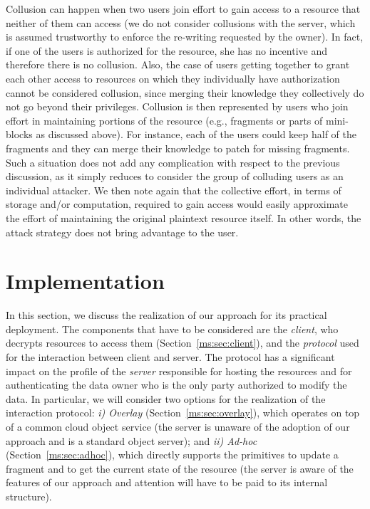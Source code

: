 \medskip
{}
Collusion can happen when two users join effort to gain access to a resource that neither of them can access (we do not consider collusions with the server, which is assumed trustworthy to enforce the re-writing requested by the owner). In fact, if one of the users is authorized for the resource, she has no incentive and therefore there is no collusion. Also, the case of users getting together to grant each other access to resources on which they individually have authorization cannot be considered collusion, since merging their knowledge they collectively do not go beyond their privileges. Collusion is then represented by users who join effort in maintaining portions of the resource (e.g., fragments or parts of mini-blocks as discussed above). For instance, each of the users could keep half of the fragments and they can merge their knowledge to patch for missing fragments. Such a situation does not add any complication with respect to the previous discussion, as it simply reduces to consider the group of colluding users as an individual attacker. We then note again that the collective effort, in terms of storage and/or computation, required to gain access would easily approximate the effort of maintaining the original plaintext resource itself. In other words, the attack strategy does not bring advantage to the user.


\section{Implementation}\label{ms:sec:expe}
In this section, we discuss the realization of our approach for its practical deployment. The components that have to be considered are the {\em client\/}, who decrypts resources to access them (Section~\ref{ms:sec:client}), and the {\em protocol\/} used for the interaction between client and server. The protocol has a significant impact on the profile of the {\em server\/} responsible for hosting the resources and for authenticating the data owner who is the only party authorized to modify the data. In particular, we will consider two options for the realization of the interaction protocol: {\em i) Overlay\/} (Section~\ref{ms:sec:overlay}), which operates on top of a common cloud object service (the server is unaware of the adoption of our approach and is a standard object server); and {\em ii) Ad-hoc} (Section~\ref{ms:sec:adhoc}), which directly supports the primitives to update a fragment and to get the current state of the resource (the server is aware of the features of our approach and attention will have to be paid to its internal structure).
 
